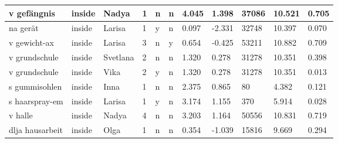 \begin{longtable}{|p{4cm}|p{1cm}|p{1.2cm}|p{0.5cm}|p{0.5cm}|p{0.5cm}|R{1cm}|R{1cm}|R{1cm}|R{1cm}|R{1cm}|}
v gef\"{a}ngnis            & inside            & Nadya         & 1                                   & n                          & n                          & 4.045      & 1.398         & 37086                   & 10.521                        & 0.705                   \\ \hline
na ger\"{a}t               & inside            & Larisa        & 1                                   & y                          & n                          & 0.097      & -2.331        & 32748                   & 10.397                        & 0.070                   \\ \hline
v gewicht-ax               & inside            & Larisa        & 3                                   & n                          & y                          & 0.654      & -0.425        & 53211                   & 10.882                        & 0.709                   \\ \hline
v grundschule              & inside            & Svetlana      & 2                                   & n                          & n                          & 1.320      & 0.278         & 31278                   & 10.351                        & 0.398                   \\ \hline
v grundschule              & inside            & Vika          & 2                                   & y                          & n                          & 1.320      & 0.278         & 31278                   & 10.351                        & 0.013                   \\ \hline
s gummisohlen              & inside            & Inna          & 1                                   & n                          & n                          & 2.375   & 0.865         & 80                      & 4.382                         & 0.121                   \\ \hline
s haarspray-em             & inside            & Larisa        & 1                                   & y                          & n                          & 3.174      & 1.155         & 370                     & 5.914                         & 0.028                   \\ \hline
v halle                    & inside            & Nadya         & 4                                   & n                          & n                          & 3.203      & 1.164         & 50556                   & 10.831                        & 0.719                   \\ \hline
dlja hausarbeit            & inside            & Olga          & 1                                   & n                          & n                          & 0.354      & -1.039        & 15816                   & 9.669                         & 0.294                   \\ \hline

\end{longtable}
